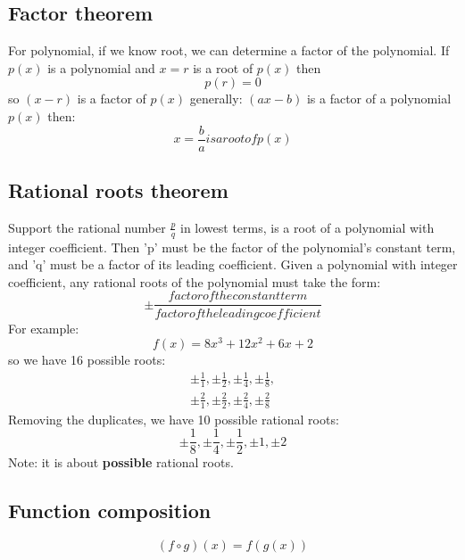 \documentclass{article}
\begin{document}
\subsection{Factor theorem}
For polynomial, if we know root, we can determine a factor of the
polynomial. If $p(x)$ is a polynomial and $x=r$ is a root of $p(x)$ then
\begin{equation}
  p(r) = 0
\end{equation}
so $(x-r)$ is a factor of $p(x)$
generally: $(ax-b)$ is a factor of a polynomial $p(x)$ then:
\begin{equation}
  x = \frac{b}{a} is a root of p(x)
\end{equation}

\subsection{Rational roots theorem}
Support the rational number $\frac{p}{q}$ in lowest terms, is a root of a polynomial
with integer coefficient.
Then 'p' must be the factor of the polynomial's constant term, and 'q' must be a factor
of its leading coefficient.
Given a polynomial with integer coefficient, any rational roots of the polynomial must take the
form:
\begin{equation}
  \pm \frac{factor  of  the  constant  term}{factor  of  the  leading  coefficient}
\end{equation}
For example:
\begin{equation}
  f(x) = 8x^3 + 12x^2 + 6x + 2
\end{equation}
so we have 16 possible roots:
\begin{equation}
  \begin{gathered}
    \pm \frac{1}{1}, \pm \frac{1}{2}, \pm \frac{1}{4}, \pm \frac{1}{8}, \\
    \pm \frac{2}{1}, \pm \frac{2}{2}, \pm \frac{2}{4}, \pm \frac{2}{8}
  \end{gathered}
\end{equation}
Removing the duplicates, we have 10 possible rational roots:
\begin{equation}
  \pm \frac{1}{8}, \pm \frac{1}{4}, \pm \frac{1}{2}, \pm 1, \pm 2
\end{equation}
Note: it is about \textbf{possible} rational roots.

\subsection{Function composition}
\begin{equation}
  (f \circ g)(x) = f(g(x))
\end{equation}
\end{document}
